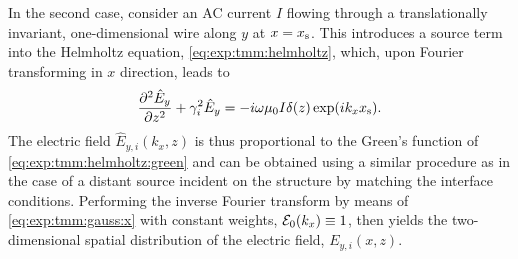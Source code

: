 In the second case, \textcite{Langevin2024} consider an AC current $I$ flowing through a translationally invariant, one-dimensional wire along $y$ at $x=x_{\mathrm{s}}$.
This introduces a source term into the Helmholtz equation, \cref{eq:exp:tmm:helmholtz}, which, upon Fourier transforming in $x$ direction, leads to
\begin{equation}\label{eq:exp:tmm:helmholtz:green}
    \pdv[2]{\hat{E}_y}{z} + \gamma_i^2\hat{E}_y = -i\omega\mu_0 I\delta(z)\exp(i k_x x_{\mathrm{s}}).
\end{equation}
The electric field $\hat{E}_{y,i}(k_x, z)$ is thus proportional to the Green's function of \cref{eq:exp:tmm:helmholtz:green} and can be obtained using a similar procedure as in the case of a distant source incident on the structure by matching the interface conditions.
Performing the inverse Fourier transform by means of \cref{eq:exp:tmm:gauss:x} with constant weights, $\mathcal{E}_0(k_x)\equiv 1$, then yields the two-dimensional spatial distribution of the electric field, $E_{y,i}(x, z)$.

